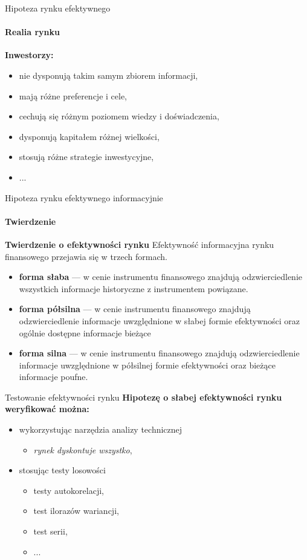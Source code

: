 \documentclass[a4paper, 11pt]{beamer}
\begin{document}
	\begin{frame}{Hipoteza rynku efektywnego}
		\framesubtitle{Realia rynku}
		\textbf{Inwestorzy:}
		\begin{itemize}
			\item nie dysponują takim samym zbiorem informacji,
			\item mają różne preferencje i cele,
			\item cechują się różnym poziomem wiedzy i doświadczenia,
			\item dysponują kapitałem różnej wielkości,
			\item stosują różne strategie inwestycyjne,
			\item ...
		\end{itemize}
	\end{frame}
	
	\begin{frame}{Hipoteza rynku efektywnego informacyjnie}
		\framesubtitle{Twierdzenie}
		\begin{block}{\textbf{Twierdzenie o efektywności rynku}}
			Efektywność informacyjna rynku finansowego przejawia się w trzech formach.
			\begin{itemize}
				\item \textbf{forma słaba} --- w cenie instrumentu finansowego znajdują
					odzwierciedlenie wszystkich informacje historyczne z instrumentem powiązane.
				\item \textbf{forma półsilna} --- w cenie instrumentu finansowego znajdują
					odzwierciedlenie informacje uwzględnione w słabej formie efektywności oraz
					ogólnie dostępne informacje bieżące
				\item \textbf{forma silna} --- w cenie instrumentu finansowego znajdują
					odzwierciedlenie informacje uwzględnione w półsilnej formie efektywności oraz
					bieżące informacje poufne.
			\end{itemize}
		\end{block}
	\end{frame}
	
	\begin{frame}{Testowanie efektywności rynku}
		\textbf{Hipotezę o słabej efektywności rynku weryfikować można:}
		\begin{itemize}
			\item wykorzystując narzędzia analizy technicznej
			\begin{itemize}
				\item \textit{rynek dyskontuje wszystko},
			\end{itemize}
			\item stosując testy losowości
			\begin{itemize}
				\item testy autokorelacji,
				\item test ilorazów wariancji,
				\item test serii,
				\item ...
			\end{itemize}
		\end{itemize}
	\end{frame}
	
\end{document}
